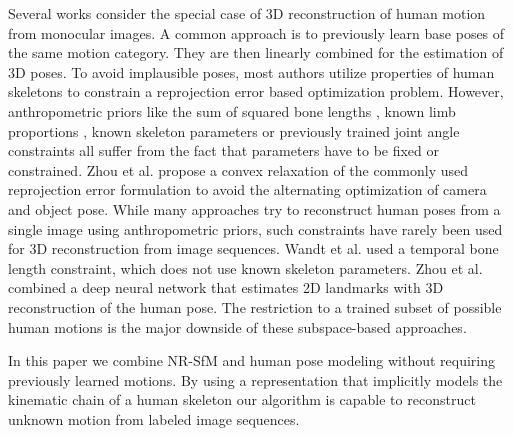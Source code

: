\documentclass[10pt,letterpaper]{article}
\begin{document}
Several works consider the special case of 3D reconstruction of human motion from monocular images. A common approach is to previously learn base poses of the same motion category. They are then linearly combined for the estimation of 3D poses. To avoid implausible poses, most authors utilize properties of human skeletons to constrain a reprojection error based optimization problem. However, anthropometric priors like the sum of squared bone lengths \cite{Ramakrishna12}, known limb proportions \cite{Wang2014}, known skeleton parameters \cite{ChenC09} or previously trained joint angle constraints \cite{Akhter2015} all suffer from the fact that parameters have to be fixed or constrained. Zhou et al. \cite{ZhouConvexRelax2015} propose a convex relaxation of the commonly used reprojection error formulation to avoid the alternating optimization of camera and object pose. While many approaches try to reconstruct human poses from a single image using anthropometric priors, such constraints have rarely been used for 3D reconstruction from image sequences. Wandt et al. \cite{Wandt2016} used a temporal bone length constraint, which does not use known skeleton parameters. Zhou et al. \cite{Zhou2016} combined a deep neural network that estimates 2D landmarks with 3D reconstruction of the human pose. The restriction to a trained subset of possible human motions is the major downside of these subspace-based approaches.

In this paper we combine NR-SfM and human pose modeling without requiring previously learned motions. By using a representation that implicitly models the kinematic chain of a human skeleton our algorithm is capable to reconstruct unknown motion from labeled image sequences.
\end{document}
